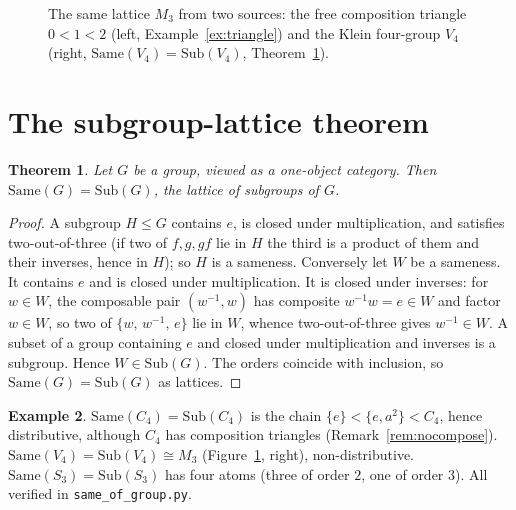 \documentclass[11pt]{amsart}
\newtheorem{thm}{Theorem}[section]
\theoremstyle{definition}
\newtheorem{ex}[thm]{Example}
\newcommand{\Same}{\mathrm{Same}}
\newcommand{\Sub}{\mathrm{Sub}}
\begin{document}
\begin{figure}[ht]
\centering
{}
\qquad\qquad
{}
\caption{The same lattice $M_3$ from two sources: the free composition triangle
$0<1<2$ (left, Example~\ref{ex:triangle}) and the Klein four-group $V_4$ (right,
$\Same(V_4)=\Sub(V_4)$, Theorem~\ref{thm:subgroup}).}
\label{fig:m3}
\end{figure}

\section{The subgroup-lattice theorem}\label{sec:group}

\begin{thm}\label{thm:subgroup}
Let $G$ be a group, viewed as a one-object category. Then $\Same(G)=\Sub(G)$,
the lattice of subgroups of $G$.
\end{thm}

\begin{proof}
A subgroup $H\le G$ contains $e$, is closed under multiplication, and satisfies
two-out-of-three (if two of $f,g,gf$ lie in $H$ the third is a product of them
and their inverses, hence in $H$); so $H$ is a sameness. Conversely let $W$ be a
sameness. It contains $e$ and is closed under multiplication. It is closed under
inverses: for $w\in W$, the composable pair $(w^{-1},w)$ has composite
$w^{-1}w=e\in W$ and factor $w\in W$, so two of $\{w,\,w^{-1},\,e\}$ lie in $W$,
whence two-out-of-three gives $w^{-1}\in W$. A subset of a group containing $e$
and closed under multiplication and inverses is a subgroup. Hence $W\in\Sub(G)$.
The orders coincide with inclusion, so $\Same(G)=\Sub(G)$ as lattices.
\end{proof}

\begin{ex}\label{ex:c4}
$\Same(C_4)=\Sub(C_4)$ is the chain $\{e\}<\{e,a^{2}\}<C_4$, hence distributive,
although $C_4$ has composition triangles (Remark~\ref{rem:nocompose}).
$\Same(V_4)=\Sub(V_4)\cong M_3$ (Figure~\ref{fig:m3}, right), non-distributive.
$\Same(S_3)=\Sub(S_3)$ has four atoms (three of order $2$, one of order $3$).
All verified in \texttt{same\_of\_group.py}.
\end{ex}
\end{document}
